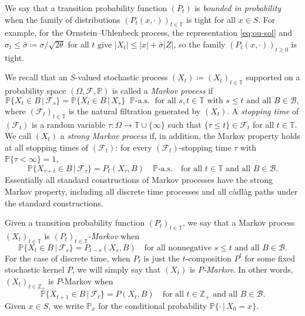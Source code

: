 \documentclass[12pt,reqno]{amsart}
\numberwithin{equation}{section}
\theoremstyle{definition}
\newcommand{\1}{\mathbbm{1}}
\newcommand{\ZZ}{\mathbb{Z}}
\newcommand{\PP}{\mathbb P}
\newcommand{\TT}{\mathbb T}
\newcommand{\fF}{\mathcal{F}}
\newcommand{\bB}{\mathscr{B}}
\newcommand{\navy}[1]{\textit{\textcolor{blue!40!black}{#1}}}
\begin{document}
We say that a transition probability function $(P_t)$ is \navy{bounded in probability} when the
family of distributions $(P_t(x, \cdot))_{t \in \TT}$ is tight for all $x \in S$.
For example, for the Ornstein--Uhlenbeck process, the representation \eqref{eq:ou-sol}
and $\sigma_t \leq \bar \sigma \coloneq \sigma / \sqrt{2\theta}$ for all $t$
give $|X_t| \leq |x| + \bar \sigma |Z|$, so the family $(P_t(x, \cdot))_{t
\geq 0}$ is tight.

We recall that an $S$-valued stochastic process $(X_t) \coloneq (X_t)_{t \in
\TT}$ supported on a probability space $(\Omega, \fF, \PP)$ is called a
\navy{Markov process} if
%
\begin{equation*}
    \PP\{X_t \in B \,|\, \fF_s\} = \PP\{X_t \in B \,|\, X_s\}
    \;\; \PP\text{-a.s.}
    \; \text{ for all $s, t \in \TT$ with $s \leq t$ and all $B \in \bB$},
\end{equation*}
%
where $(\fF_t)_{t \in \TT}$ is the natural filtration generated by $(X_t)$.
A \navy{stopping time} of $(\fF_t)$ is a random variable
$\tau \colon \Omega \to \TT \cup \{\infty\}$ such that $\{\tau \leq t\} \in
\fF_t$ for all $t \in \TT$.
We call $(X_t)$ a
\navy{strong Markov process} if, in addition, the Markov property holds at all
stopping times of $(\fF_t)$: for every $(\fF_t)$-stopping time $\tau$ with
$\PP\{\tau < \infty\} = 1$,
%
\begin{equation*}
    \PP\{X_{\tau + t} \in B \,|\, \fF_\tau\} = P_t(X_\tau, B)
    \quad \PP\text{-a.s.}
    \quad \text{for all $t \in \TT$ and all $B \in \bB$}.
\end{equation*}
%
Essentially all standard constructions of Markov processes have the strong
Markov property, including all discrete time processes and all c\`adl\`ag paths
under the standard constructions.

Given a transition probability function $(P_t)_{t \in \TT}$, we say that a Markov process
$(X_t)_{t \in \TT}$ is \navy{$(P_t)_{t \in \TT}$-Markov} when 
%
\begin{equation*}
    \PP\{X_t \in B \,|\, \fF_s\} = P_{t -s}(X_s, B)
    \quad \text{for all nonnegative $s \leq t$ and all $B \in \bB$}.
\end{equation*}
%
For the case of discrete time, when $P_t$ is just the $t$-composition $P^t$ for
some fixed stochastic kernel $P$, we will simply say that $(X_t)$ is
\navy{$P$-Markov}.  In other words, $(X_t)_{t \in \ZZ_+}$ is $P$-Markov when
%
\begin{equation*}
    \PP\{X_{t+1} \in B \,|\, \fF_t\} = P(X_t, B)
    \quad \text{for all $t \in \ZZ_+$ and all $B \in \bB$}.
\end{equation*}
%
Given $x \in S$, we write $\PP_x$ for the conditional probability $\PP\{ \cdot \,|\, X_0 = x\}$.
\end{document}
